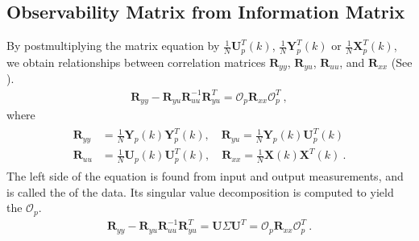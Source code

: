 \documentclass[letterpaper,10pt,english]{sphinxmanual}
\begin{document}
\subsection{Observability Matrix from Information Matrix}
\label{\detokenize{theory/srim:observability-matrix-from-information-matrix}}
\sphinxAtStartPar
By post\sphinxhyphen{}multiplying the matrix equation by
\(\frac{1}{N}\bm{U}_{p}^{T}(k)\),
\(\frac{1}{N}\bm{Y}_{p}^{T}(k)\) or
\(\frac{1}{N}\bm{X}_{p}^{T}(k)\), we obtain relationships
between correlation matrices \(\bm{R}_{yy}\),
\(\bm{R}_{yu}\), \(\bm{R}_{uu}\), and
\(\bm{R}_{xx}\) (See
{\hyperref[\detokenize{theory/srim:appendix-manipulation-of-discrete-time-system-matrix-equation-into-correlation-matrix-relationships}]{}}).
\begin{equation*}
\begin{split}\bm{R}_{yy} - \bm{R}_{yu}\bm{R}_{uu}^{-1}\bm{R}_{yu}^{T} = \mathcal{O}_{p}\bm{R}_{xx}\mathcal{O}_{p}^{T} ~,\end{split}
\end{equation*}
\sphinxAtStartPar
where
\begin{equation*}
\begin{split}\begin{aligned}
\bm{R}_{yy} &= \frac{1}{N}\bm{Y}_{p}(k)\bm{Y}_{p}^{T}(k), \quad{}
\bm{R}_{yu} = \frac{1}{N}\bm{Y}_{p}(k)\bm{U}_{p}^{T}(k) \\
\bm{R}_{uu} &= \frac{1}{N}\bm{U}_{p}(k)\bm{U}_{p}^{T}(k) , \quad{}
\bm{R}_{xx} = \frac{1}{N}\bm{X}(k)\bm{X}^{T}(k) ~.
\end{aligned}\end{split}
\end{equation*}
\sphinxAtStartPar
The left side of the equation is found from input and output
measurements, and is called the  of the data. Its
singular value decomposition is computed to yield the  \(\mathcal{O}_{p}\).
\begin{equation*}
\begin{split}\bm{R}_{yy} - \bm{R}_{yu}\bm{R}_{uu}^{-1}\bm{R}_{yu}^{T} = \bm{U} \Sigma \bm{U}^{T} = \mathcal{O}_{p}\bm{R}_{xx}\mathcal{O}_{p}^{T} ~.\end{split}
\end{equation*}
\end{document}
